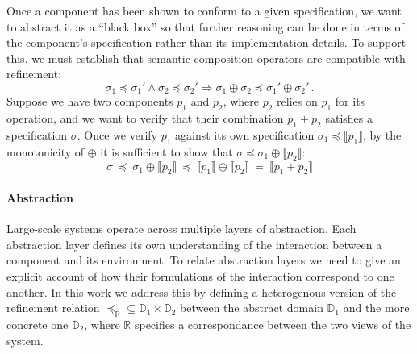 \documentclass[acmsmall,authordraft]{acmart}
\newcommand{\refby}{\preceq}
\begin{document}
Once a component has been shown to conform to a given specification,
we want to abstract it as a ``black box''
so that further reasoning can be done in terms of
the component's specification rather than its implementation details.
To support this,
we must establish that semantic composition operators
are compatible with refinement:
\[ \sigma_1 \refby \sigma_1' \wedge
   \sigma_2 \refby \sigma_2' \Rightarrow
   \sigma_1 \oplus \sigma_2 \refby \sigma_1' \oplus \sigma_2' \,. \]
Suppose we have two components $p_1$ and $p_2$,
where $p_2$ relies on $p_1$ for its operation,
and we want to verify that their combination $p_1 + p_2$
satisfies a specification $\sigma$.
Once we verify $p_1$ against its own specification
$\sigma_1 \refby \llbracket p_1 \rrbracket$,
by the monotonicity of ${\oplus}$ it is sufficient to show that
$\sigma \refby \sigma_1 \oplus \llbracket p_2 \rrbracket$:
\[
   \sigma \:\refby\:
   \sigma_1 \oplus \llbracket p_2 \rrbracket \:\refby\:
   \llbracket p_1 \rrbracket \oplus \llbracket p_2 \rrbracket \:=\:
   \llbracket p_1 + p_2 \rrbracket
\]


\paragraph{Abstraction} %

Large-scale systems operate across multiple layers of abstraction.
Each abstraction layer defines its own understanding of the interaction
between a component and its environment.
To relate abstraction layers we need to give
an explicit account of how their formulations of the interaction
correspond to one another.
In this work we address this by defining a heterogenous version
of the refinement relation
${\refby_\mathbb{R}} \subseteq
 \mathbb{D}_1 \times \mathbb{D}_2$ between
the abstract domain $\mathbb{D}_1$ and
the more concrete one $\mathbb{D}_2$, where
$\mathbb{R}$ specifies a correspondance between
the two views of the system.

\end{document}
